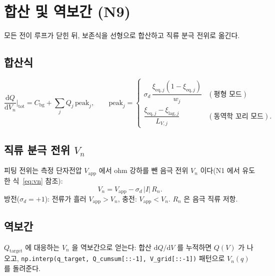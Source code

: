 \documentclass[11pt,a4paper]{article}
\newcommand{\dd}{\mathrm{d}}
\newcommand{\eq}{\mathrm{eq}}
\newcommand{\app}{\mathrm{app}}
\newcommand{\bg}{\mathrm{bg}}
\newcommand{\lag}{\mathrm{lag}}
\newcommand{\tot}{\mathrm{tot}}
\newcommand{\target}{\mathrm{target}}
\newcommand{\code}[1]{\texttt{#1}}
\begin{document}
\section{합산 및 역보간 (N9)}\label{sec:sum}
모든 전이 루프가 닫힌 뒤, 보존식을 선형으로 합산하고 직류 분극 전위로 옮긴다.

\subsection{합산식}
\begin{equation}
\frac{\dd Q}{\dd V_n}\bigg|_\tot
=C_\bg+\sum_j Q_j\,\mathrm{peak}_j,
\qquad
\mathrm{peak}_j=
\begin{cases}
\sigma_d\,\dfrac{\xi_{\eq,j}(1-\xi_{\eq,j})}{w_j} & (\text{평형 모드})\\[4pt]
\dfrac{\xi_{\eq,j}-\xi_{\lag,j}}{L_{V,j}} & (\text{동역학 꼬리 모드}).
\end{cases}
\label{eq:sum}
\end{equation}

\subsection{직류 분극 전위 $V_n$}
피팅 전위는 측정 단자전압 $V_\app$ 에서 ohm 강하를 뺀 음극 전위 $V_n$ 이다(N1 에서 유도한 식~\eqref{eq:vn} 참조):
\begin{equation}
V_n=V_\app-\sigma_d\,|I|\,R_n.
\label{eq:vnN9}
\end{equation}
방전($\sigma_d=+1$): 전류가 흘러 $V_\app>V_n$, 충전: $V_\app<V_n$. $R_n$ 은 음극 직류 저항.

\subsection{역보간}
$Q_\target$ 에 대응하는 $V_n$ 을 역보간으로 얻는다: 합산 $\dd Q/\dd V$ 를 누적하면 $Q(V)$ 가 나오고,
\code{np.interp(q\_target, Q\_cumsum[::-1], V\_grid[::-1])} 패턴으로 $V_n(q)$ 를 돌려준다.

\end{document}
